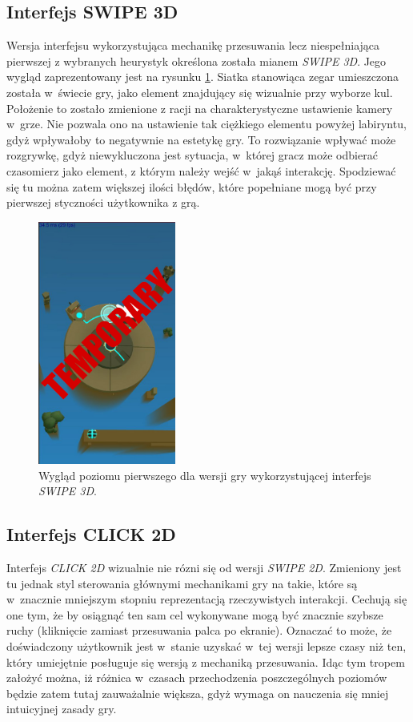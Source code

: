 \documentclass[a4paper,12pt,numbers=noenddot]{report}
\begin{document}
\subsection{Interfejs SWIPE 3D}
Wersja interfejsu wykorzystująca mechanikę przesuwania lecz niespełniająca pierwszej z wybranych heurystyk określona została mianem \textit{SWIPE 3D}. Jego wygląd zaprezentowany jest na rysunku \ref{fig:interface_swipe_3d}. Siatka stanowiąca zegar umieszczona została w~świecie gry, jako element znajdujący się wizualnie przy wyborze kul. Położenie to zostało zmienione z racji na charakterystyczne ustawienie kamery w~grze. Nie pozwala ono na ustawienie tak ciężkiego elementu powyżej labiryntu, gdyż wpływałoby to negatywnie na estetykę gry. To rozwiązanie wpływać może rozgrywkę, gdyż niewykluczona jest sytuacja, w~której gracz może odbierać czasomierz jako element, z którym  należy wejść w~jakąś interakcję. Spodziewać się tu można zatem większej ilości błędów, które popełniane mogą być przy pierwszej styczności użytkownika z grą.
\begin{figure}[h!]
	\centering
  	\includegraphics[height=8cm]{fig/tmp.jpg}
	\caption{Wygląd poziomu pierwszego dla wersji gry wykorzystującej interfejs \textit{SWIPE 3D}.}
	\label{fig:interface_swipe_3d}
\end{figure}
\subsection{Interfejs CLICK 2D}
Interfejs \textit{CLICK 2D} wizualnie nie rózni się od wersji \textit{SWIPE 2D}. Zmieniony jest tu jednak styl sterowania głównymi mechanikami gry na takie, które są w~znacznie mniejszym stopniu reprezentacją rzeczywistych interakcji. Cechują się one tym, że by osiągnąć ten sam cel wykonywane mogą być znacznie szybsze ruchy (kliknięcie zamiast przesuwania palca po ekranie). Oznaczać to może, że doświadczony użytkownik jest w~stanie uzyskać w~tej wersji lepsze czasy niż ten, który umiejętnie posługuje się wersją z mechaniką przesuwania. Idąc tym tropem założyć można, iż różnica w~czasach przechodzenia poszczególnych poziomów będzie zatem tutaj zauważalnie większa, gdyż wymaga on nauczenia się mniej intuicyjnej zasady gry.
\end{document}
